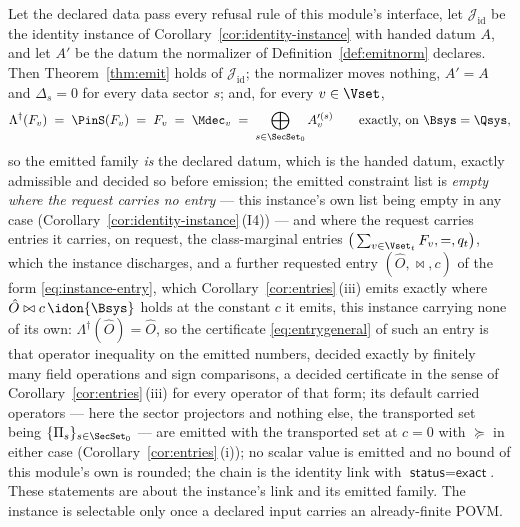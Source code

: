 \begin{corollary}
\label{cor:emitted-identity}
Let the declared data pass every refusal rule of this module's interface, let
$\mathcal{J}_{\mathrm{id}}$ be the identity instance of
Corollary~\ref{cor:identity-instance} with handed datum $A$, and let $A'$ be
the datum the normalizer of Definition~\ref{def:emitnorm} declares. Then
Theorem~\ref{thm:emit} holds of $\mathcal{J}_{\mathrm{id}}$; the normalizer
moves nothing, $A'=A$ and $\Delta_s=0$ for every data sector $s$; and, for
every $v\in\Vset$,
\begin{equation}\label{eq:emitted-identity}
  \Lambda^{\dagger}(F_v)\;=\;\PinS(F_v)\;=\;F_v\;=\;\Mdec_v
  \;=\;\bigoplus_{s\in\SecSet_0}A'^{(s)}_v
  \qquad\text{exactly, on }\Bsys=\Qsys ,
\end{equation}
so the emitted family \emph{is} the declared datum, which is the handed
datum, exactly admissible and decided so before emission; the emitted
constraint list is \emph{empty where the request carries no entry} --- this
instance's own list being empty in any case
(Corollary~\ref{cor:identity-instance}\,(I4)) --- and where the request
carries entries it carries, on request, the class-marginal entries
$\big(\sum_{v\in\Vset_t}F_v,=,q_t\big)$, which the instance discharges, and
a further requested entry $(\hat O,\bowtie,c)$ of the form
\eqref{eq:instance-entry}, which Corollary~\ref{cor:entries}\,(iii) emits
exactly where $\hat O\bowtie c\,\idon{\Bsys}$ holds at the constant $c$ it
emits, this instance carrying none of its own: $\Lambda^{\dagger}(\hat O)=\hat O$, so the
certificate \eqref{eq:entrygeneral} of such an entry is that operator
inequality on the emitted numbers, decided exactly by finitely many field
operations and sign comparisons, a decided certificate in the sense of
Corollary~\ref{cor:entries}\,(iii) for every operator of that form; its
default carried operators --- here the sector projectors and nothing else,
the transported set being $\{\Pi_s\}_{s\in\SecSet_0}$ --- are emitted with
the transported set at $c=0$ with $\succeq$ in either case
(Corollary~\ref{cor:entries}\,(i)); no scalar value is emitted and no bound
of this module's own is rounded; the chain is the identity link with
$\textsf{status}=\textsf{exact}$. These statements are about the instance's
link and its emitted family.
The instance is selectable only once a declared input carries an
already-finite POVM.
\end{corollary}

